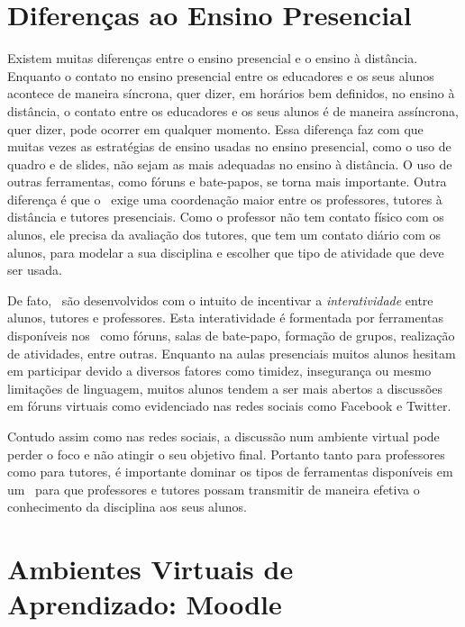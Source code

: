 
\section{Diferen{\c c}as ao Ensino Presencial}  Existem muitas diferen{\c c}as entre o ensino presencial e 
o ensino {\`a} dist{\^ a}ncia. Enquanto o contato no ensino presencial entre os educadores e os seus alunos acontece de maneira s{\' i}ncrona, 
quer dizer, em hor{\' a}rios bem definidos, no ensino {\`a} dist{\^ a}ncia, o contato entre os educadores e os seus alunos {\'e} de maneira
ass{\' i}ncrona, quer dizer, pode ocorrer em qualquer momento. Essa diferen{\c c}a faz com que muitas vezes as estrat{\'e}gias de ensino usadas no ensino 
presencial, como o uso de quadro e de slides, n{\~ a}o sejam as mais adequadas no ensino {\`a} dist{\^ a}ncia. O uso de outras ferramentas, 
como f\'oruns e bate-papos, se torna mais importante. Outra diferen{\c c}a {\'e} que o \ead\ exige uma coordena{\c c}{\~ a}o maior entre os professores, tutores
{\`a} dist{\^ a}ncia e tutores presenciais. Como o professor n{\~ a}o tem contato f{\' i}sico com os alunos, ele precisa da avalia{\c c}{\~ a}o dos tutores, 
que tem um contato di{\' a}rio com os alunos, para modelar a sua disciplina e escolher que tipo de atividade que deve ser usada.

De fato, \avas\ s{\~ a}o desenvolvidos com o intuito de incentivar 
a \emph{interatividade} entre alunos, tutores e professores. Esta interatividade {\'e} formentada por ferramentas 
dispon{\' i}veis nos \avas\ como f\'oruns, salas de bate-papo, forma{\c c}{\~ a}o de grupos, realiza{\c c}{\~ a}o de atividades, entre outras. 
Enquanto na aulas presenciais muitos alunos hesitam em participar devido a diversos fatores como timidez, inseguran{\c c}a ou 
mesmo limita{\c c}{\~ o}es de linguagem, muitos alunos tendem a ser mais abertos a discuss{\~ o}es em 
f\'oruns virtuais como evidenciado nas redes sociais como Facebook e Twitter. 

Contudo assim como nas redes sociais, a discuss{\~ a}o num ambiente virtual pode perder o foco e n{\~ a}o atingir 
o seu objetivo final. Portanto tanto para professores como para tutores, {\'e} importante dominar os 
tipos de ferramentas dispon{\' i}veis em um \ava\ para que professores e tutores possam transmitir 
de maneira efetiva o conhecimento da disciplina aos seus alunos.


\section{Ambientes Virtuais de Aprendizado: Moodle}
\label{subsec:cap1:Moodle}

